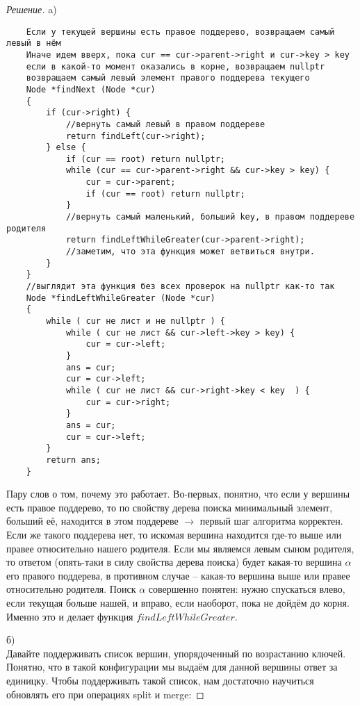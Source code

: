 \documentclass[12pt]{article}
\newenvironment{solution}[0]{\begin{proof}[Решение]}{\end{proof}}
\begin{document}
\begin{solution}
    a)
    \begin{verbatim}
    Если у текущей вершины есть правое поддерево, возвращаем самый левый в нём
    Иначе идем вверх, пока cur == cur->parent->right и cur->key > key
    если в какой-то момент оказались в корне, возвращаем nullptr
    возвращаем самый левый элемент правого поддерева текущего
    Node *findNext (Node *cur)
    {
        if (cur->right) {
            //вернуть самый левый в правом поддереве
            return findLeft(cur->right);
        } else {
            if (cur == root) return nullptr;
            while (cur == cur->parent->right && cur->key > key) {
                cur = cur->parent;
                if (cur == root) return nullptr;
            }
            //вернуть самый маленький, больший key, в правом поддереве родителя 
            return findLeftWhileGreater(cur->parent->right);
            //заметим, что эта функция может ветвиться внутри.
        }
    }
    //выглядит эта функция без всех проверок на nullptr как-то так
    Node *findLeftWhileGreater (Node *cur)
    {
        while ( cur не лист и не nullptr ) {
            while ( cur не лист && cur->left->key > key) {
                cur = cur->left;
            }
            ans = cur;
            cur = cur->left;
            while ( cur не лист && cur->right->key < key  ) {
                cur = cur->right;
            }
            ans = cur;
            cur = cur->left;
        }
        return ans;
    }
    \end{verbatim}

    Пару слов о том, почему это работает. Во-первых, понятно, что если у вершины есть правое поддерево, то
    по свойству дерева поиска минимальный элемент, больший её, находится в этом поддереве $\rightarrow$ первый
    шаг алгоритма корректен. Если же такого поддерева нет, то искомая вершина находится где-то выше или правее относительно нашего родителя.
    Если мы являемся левым сыном родителя, то ответом (опять-таки в силу свойства дерева поиска)
    будет какая-то вершина $\alpha$ его правого поддерева, в противном случае -- какая-то вершина выше или правее относительно родителя.
    Поиск $\alpha$ совершенно понятен: нужно спускаться влево, если текущая больше нашей, и вправо, если наоборот, пока не дойдём до корня.
    Именно это и делает функция $findLeftWhileGreater$.

    б) \\Давайте поддерживать список вершин, упорядоченный по возрастанию ключей.
    Понятно, что в такой конфигурации мы выдаём для данной вершины ответ за единицку.
    Чтобы поддерживать такой список, нам достаточно научиться обновлять его при операциях split и merge:
    

\end{solution}
\end{document}
